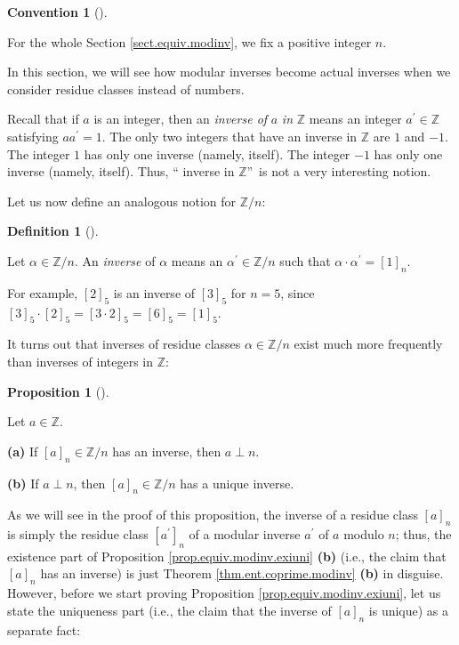 \documentclass[numbers=enddot,12pt,final,onecolumn,notitlepage]{scrartcl}%
\numberwithin{exer}{subsection}
\theoremstyle{definition}
\newtheorem{prop}[theo]{Proposition}
\newenvironment{proposition}[1][]
{\begin{prop}[#1]\begin{leftbar}}
{\end{leftbar}\end{prop}}
\newtheorem{defi}[theo]{Definition}
\newenvironment{definition}[1][]
{\begin{defi}[#1]\begin{leftbar}}
{\end{leftbar}\end{defi}}
\newtheorem{conv}[theo]{Convention}
\newenvironment{convention}[1][]
{\begin{conv}[#1]\begin{leftbar}}
{\end{leftbar}\end{conv}}
\begin{document}
\begin{convention}
For the whole Section \ref{sect.equiv.modinv}, we fix a positive integer $n$.
\end{convention}

In this section, we will see how modular inverses become actual inverses when
we consider residue classes instead of numbers.

Recall that if $a$ is an integer, then an \textit{inverse of }$a$\textit{ in
}$\mathbb{Z}$ means an integer $a^{\prime}\in\mathbb{Z}$ satisfying
$aa^{\prime}=1$. The only two integers that have an inverse in $\mathbb{Z}$
are $1$ and $-1$. The integer $1$ has only one inverse (namely, itself). The
integer $-1$ has only one inverse (namely, itself). Thus, \textquotedblleft
inverse in $\mathbb{Z}$\textquotedblright\ is not a very interesting notion.

Let us now define an analogous notion for $\mathbb{Z}/n$:

\begin{definition}
\label{def.equiv.modinv.inverse}Let $\alpha\in\mathbb{Z}/n$. An
\textit{inverse} of $\alpha$ means an $\alpha^{\prime}\in\mathbb{Z}/n$ such
that $\alpha\cdot\alpha^{\prime}=\left[  1\right]  _{n}$.
\end{definition}

For example, $\left[  2\right]  _{5}$ is an inverse of $\left[  3\right]
_{5}$ for $n=5$, since $\left[  3\right]  _{5}\cdot\left[  2\right]
_{5}=\left[  3\cdot2\right]  _{5}=\left[  6\right]  _{5}=\left[  1\right]
_{5}$.

It turns out that inverses of residue classes $\alpha\in\mathbb{Z}/n$ exist
much more frequently than inverses of integers in $\mathbb{Z}$:

\begin{proposition}
\label{prop.equiv.modinv.exiuni}Let $a\in\mathbb{Z}$.

\textbf{(a)} If $\left[  a\right]  _{n}\in\mathbb{Z}/n$ has an inverse, then
$a\perp n$.

\textbf{(b)} If $a\perp n$, then $\left[  a\right]  _{n}\in\mathbb{Z}/n$ has a
unique inverse.
\end{proposition}

As we will see in the proof of this proposition, the inverse of a residue
class $\left[  a\right]  _{n}$ is simply the residue class $\left[  a^{\prime
}\right]  _{n}$ of a modular inverse $a^{\prime}$ of $a$ modulo $n$; thus, the
existence part of Proposition \ref{prop.equiv.modinv.exiuni} \textbf{(b)}
(i.e., the claim that $\left[  a\right]  _{n}$ has an inverse) is just Theorem
\ref{thm.ent.coprime.modinv} \textbf{(b)} in disguise. However, before we
start proving Proposition \ref{prop.equiv.modinv.exiuni}, let us state the
uniqueness part (i.e., the claim that the inverse of $\left[  a\right]  _{n}$
is unique) as a separate fact:
\end{document}
